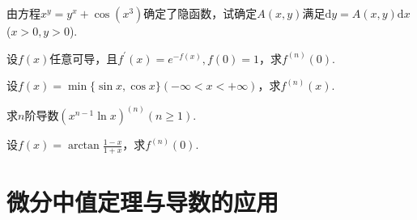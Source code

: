 \begin{xiti}
	\item 由方程$x ^ { y } = y ^ { x } + \cos \left( x ^ { 3 } \right)$确定了隐函数，试确定$A(x,y)$满足$\mathrm{ d }y=A(x,y)\mathrm{ d }x$($x>0,y>0$).
	\item 设$f(x)$任意可导，且$f ^ { \prime } ( x ) = e ^ { - f ( x ) } , f ( 0 ) = 1$，求$f^{(n)}(0)$.
	\item 设$f ( x ) = \min \{ \sin x , \cos x \} ( - \infty < x < + \infty )$，求$f^{(n)}(x)$.
	\item 求$n$阶导数$\left( x ^ { n - 1 } \ln x \right) ^ { ( n ) } ( n \geqslant 1 )$.
	\item 设$f ( x ) = \arctan \frac { 1 - x } { 1 + x }$，求$f^{(n)}(0)$.
\end{xiti}



\section{微分中值定理与导数的应用}
